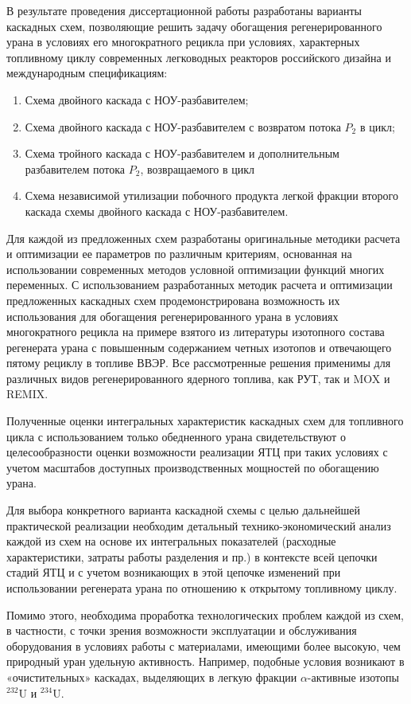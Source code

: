 В результате проведения диссертационной работы разработаны варианты каскадных схем, позволяющие решить задачу обогащения регенерированного урана в условиях его многократного рецикла при условиях, характерных топливному циклу современных легководных реакторов российского дизайна и международным спецификациям:

\begin{enumerate}
  \item Схема двойного каскада с НОУ-разбавителем;
  \item Схема двойного каскада с НОУ-разбавителем с возвратом потока $P_2$ в цикл;
  \item Схема тройного каскада с НОУ-разбавителем и дополнительным разбавителем потока $P_2$, возвращаемого в цикл
  \item Схема независимой утилизации побочного продукта легкой фракции второго каскада схемы двойного каскада с НОУ-разбавителем.
\end{enumerate}

Для каждой из предложенных схем разработаны оригинальные методики расчета и оптимизации ее параметров по различным критериям, основанная на использовании современных методов условной оптимизации функций многих переменных. С использованием разработанных методик расчета и оптимизации предложенных каскадных схем продемонстрирована возможность их использования для обогащения регенерированного урана в условиях многократного рецикла на примере взятого из литературы изотопного состава регенерата урана с повышенным содержанием четных изотопов и отвечающего пятому рециклу в топливе ВВЭР. Все рассмотренные решения применимы для различных видов регенерированного ядерного топлива, как РУТ, так и MOX и REMIX.

Полученные оценки интегральных характеристик каскадных схем для топливного цикла с использованием только обедненного урана свидетельствуют о целесообразности оценки возможности реализации ЯТЦ при таких условиях с учетом масштабов доступных производственных мощностей по обогащению урана.

Для выбора конкретного варианта каскадной схемы с целью дальнейшей практической реализации необходим детальный технико-экономический анализ каждой из схем на основе их интегральных показателей (расходные характеристики, затраты работы разделения и пр.) в контексте всей цепочки стадий ЯТЦ и с учетом возникающих в этой цепочке изменений при использовании регенерата урана по отношению к открытому топливному циклу. 

Помимо этого, необходима проработка технологических проблем каждой из схем, в частности, с точки зрения возможности эксплуатации и обслуживания оборудования в условиях работы с материалами, имеющими более высокую, чем природный уран удельную активность. Например, подобные условия возникают в «очистительных» каскадах, выделяющих в легкую фракции $\alpha$-активные изотопы $^{232}$U и $^{234}$U. 




